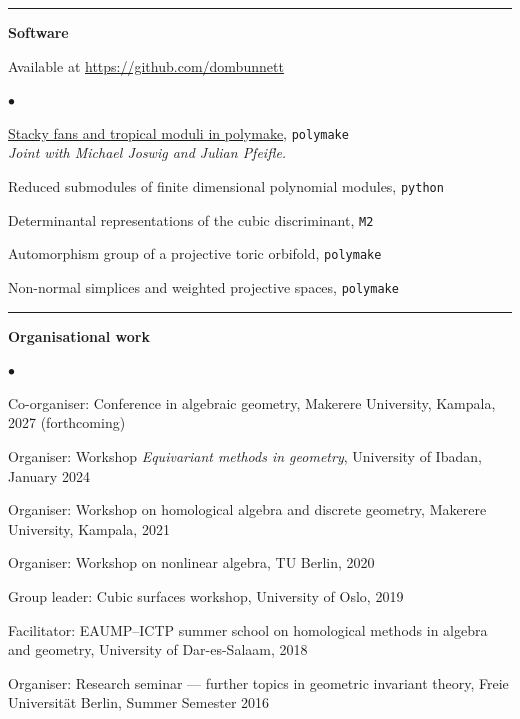 \documentclass[10pt]{article}
\newcommand{\cvsection}[1]{%
  \par\vspace{0.24cm}%
  \noindent\rule{\textwidth}{0.4pt}%
  \par\vspace{0.12cm}%
  \noindent\textbf{\large #1}%
  \par\vspace{0.12cm}%
}
\newenvironment{cvlist}%
  {\begin{list}{$\bullet$}{%
     \setlength{\leftmargin}{1.1em}\setlength{\labelwidth}{0.8em}%
     \setlength{\itemsep}{0.12cm}\setlength{\parsep}{0pt}%
     \setlength{\topsep}{0pt}\setlength{\partopsep}{0pt}}}%
  {\end{list}}
\begin{document}
\cvsection{Software}
Available at \url{https://github.com/dombunnett}
\par\vspace{0.12cm}
\begin{cvlist}
\item \href{https://github.com/micjoswig/TropicalModuliData/tree/main/2023-Stacky_fans_and_tropical_moduli_in_polymake}{Stacky fans and tropical moduli in polymake}, \texttt{polymake}\\
{\em Joint with Michael Joswig and Julian Pfeifle.}
\item Reduced submodules of finite dimensional polynomial modules, \texttt{python}
\item Determinantal representations of the cubic discriminant, \texttt{M2}
\item Automorphism group of a projective toric orbifold, \texttt{polymake}
\item Non-normal simplices and weighted projective spaces, \texttt{polymake}
\end{cvlist}

\cvsection{Organisational work}
\begin{cvlist}
\item Co-organiser: Conference in algebraic geometry, Makerere University,
Kampala, 2027 (forthcoming)
\item Organiser: Workshop {\em Equivariant methods in geometry},
University of Ibadan, January 2024
\item Organiser: Workshop on homological algebra and discrete geometry,
Makerere University, Kampala, 2021
\item Organiser: Workshop on nonlinear algebra, TU Berlin, 2020
\item Group leader: Cubic surfaces workshop, University of Oslo, 2019
\item Facilitator: EAUMP--ICTP summer school on homological methods in algebra
and geometry, University of Dar-es-Salaam, 2018
\item Organiser: Research seminar --- further topics in geometric invariant
theory, Freie Universit\"at Berlin, Summer Semester 2016
\end{cvlist}
\end{document}
